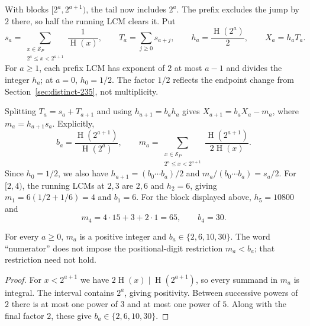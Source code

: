 \documentclass[11pt]{article}
\newcommand{\hgt}{\operatorname{H}}
\begin{document}
With blocks $[2^a,2^{a+1})$, the tail now includes $2^a$. The prefix
excludes the jump by $2$ there, so half the running LCM clears it. Put
\[
 s_a=\sum_{\substack{x\in\mathcal S_P\\2^a\le x<2^{a+1}}}\frac1{\hgt(x)},
 \qquad T_a=\sum_{j\ge0}s_{a+j},\qquad
 h_a=\frac{\hgt(2^a)}2,\qquad X_a=h_aT_a.
\]
For $a\ge1$, each prefix LCM has exponent of $2$ at most $a-1$ and
divides the integer $h_a$; at $a=0$, $h_0=1/2$. The factor $1/2$ reflects
the endpoint change from Section~\ref{sec:distinct-235}, not multiplicity.

Splitting $T_a=s_a+T_{a+1}$ and using $h_{a+1}=b_ah_a$ gives
$X_{a+1}=b_aX_a-m_a$, where $m_a=h_{a+1}s_a$. Explicitly,
\begin{equation}\label{eq:actual-digit}
 b_a=\frac{\hgt(2^{a+1})}{\hgt(2^a)},\qquad
 m_a=\sum_{\substack{x\in\mathcal S_P\\2^a\le x<2^{a+1}}}
       \frac{\hgt(2^{a+1})}{2\hgt(x)}.
\end{equation}
Since $h_0=1/2$, we also have $h_{a+1}=(b_0\cdots b_a)/2$ and
$m_a/(b_0\cdots b_a)=s_a/2$.
For $[2,4)$, the running LCMs at $2,3$ are $2,6$ and $h_2=6$, giving
$m_1=6(1/2+1/6)=4$ and $b_1=6$. For the block displayed above,
$h_5=10800$ and
\[
 m_4=4\cdot15+3+2\cdot1=65,\qquad b_4=30.
\]
\begin{lemma}
\label{res:dyadic-alphabet}
For every $a\ge0$, $m_a$ is a positive integer and
$b_a\in\{2,6,10,30\}$.  The word ``numerator'' does not impose the
positional-digit restriction $m_a<b_a$; that restriction need not hold.
\end{lemma}
\begin{proof}
For $x<2^{a+1}$ we have $2\hgt(x)\mid\hgt(2^{a+1})$, so every summand
in $m_a$ is integral. The interval contains $2^a$, giving positivity.
Between successive powers of $2$ there is at most one power of $3$ and
at most one power of $5$. Along with the final factor $2$, these give
$b_a\in\{2,6,10,30\}$.
\end{proof}
\end{document}
